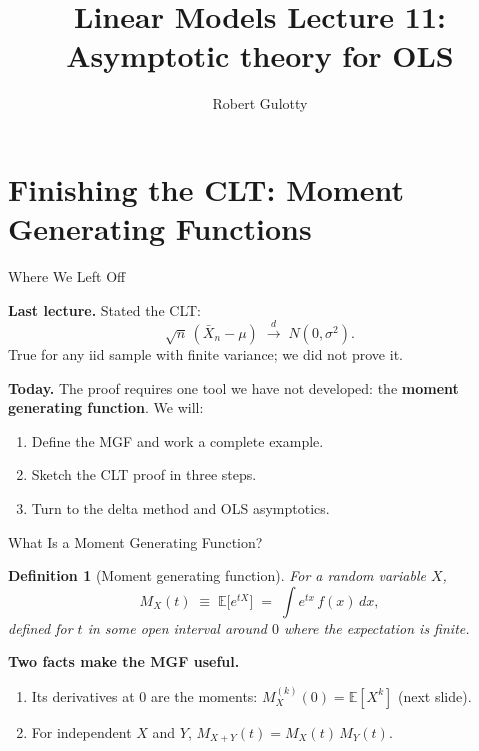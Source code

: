 \documentclass[aspectratio=169, handout, t]{beamer}
\title[PLSC 30700]{Linear Models Lecture 11: Asymptotic theory for OLS}
\author{Robert Gulotty}
\institute[Chicago]{University of Chicago}
\newtheorem{defn}{Definition}
\numberwithin{equation}{section}
\begin{document}
\begin{frame}
\maketitle
\end{frame}

\section{Finishing the CLT: Moment Generating Functions}
\setcounter{subsection}{1}

\begin{frame}{Where We Left Off}

\textbf{Last lecture.} Stated the CLT:
\[
\sqrt n\,(\bar X_n - \mu) \;\overset{d}{\to}\; N(0,\sigma^2).
\]
True for any iid sample with finite variance; we did not prove it.

\pause

\medskip

\textbf{Today.} The proof requires one tool we have not developed: the \textbf{moment generating function}. We will:
\begin{enumerate}\setlength\itemsep{2pt}
\item Define the MGF and work a complete example.
\item Sketch the CLT proof in three steps.
\item Turn to the delta method and OLS asymptotics.
\end{enumerate}

\end{frame}


\begin{frame}{What Is a Moment Generating Function?}

\begin{defn}[Moment generating function]
For a random variable $X$,
\[
M_X(t) \;\equiv\; \mathbb{E}\!\bigl[e^{tX}\bigr] \;=\; \int e^{tx}\,f(x)\,dx,
\]
defined for $t$ in some open interval around $0$ where the expectation is finite.
\end{defn}

\pause

\medskip

\textbf{Two facts make the MGF useful.}
\begin{enumerate}\setlength\itemsep{6pt}
\item Its derivatives at $0$ are the moments: $M_X^{(k)}(0) = \mathbb{E}[X^k]$ (next slide).
\item For independent $X$ and $Y$, $M_{X+Y}(t) = M_X(t)\,M_Y(t)$.
\end{enumerate}

\end{frame}
\end{document}
